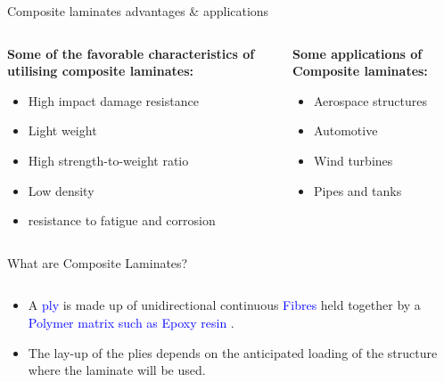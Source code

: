 \documentclass[10pt,aspectratio=169,dvipsnames]{beamer} %
\begin{document}
	\begin{frame}[standout]{Composite laminates advantages \& applications}
		\begin{columns}[T]
			\begin{column}[t]{.45\textwidth}
				\textbf{Some of the favorable characteristics of utilising composite laminates:}
				\begin{itemize}
					\item \alert{High impact damage resistance}
					\item \alert{Light weight}
					\item \alert{High strength-to-weight ratio}
					\item \alert{Low density}
					\item \alert{resistance to fatigue and corrosion}
				\end{itemize}
			\end{column}
			\begin{column}[t]{.45\textwidth}
				\textbf{Some applications of Composite laminates:}
				\begin{itemize}
					\item \alert{Aerospace structures}
					\item \alert{Automotive}
					\item \alert{Wind turbines}
					\item \alert{Pipes and tanks}
				\end{itemize}
			\end{column}
		\end{columns}
	\end{frame}
	\begin{frame}[standout]{What are Composite Laminates?}
		\begin{columns}[T]
			\begin{column}[c]{.9\textwidth}
				\small
				\begin{itemize}
					\justifying
					\item A \textcolor{blue}{ply} is made up of unidirectional continuous \textcolor{blue}{Fibres} held together by a \textcolor{blue}{Polymer matrix such as Epoxy resin} .			
					\item The lay-up of the plies depends on the anticipated loading of the structure where the laminate will be used.
				\end{itemize}
			\end{column}
		\end{columns}
	\end{frame}
	
	
	
\end{document}
